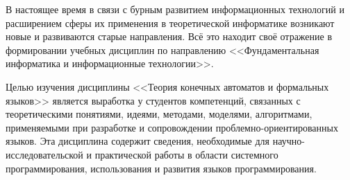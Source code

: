 \label{Intro}
В настоящее время в связи с бурным развитием информационных технологий и расширением сферы их применения в теоретической информатике возникают новые и развиваются старые направления. Всё это находит своё отражение в формировании учебных дисциплин по направлению <<Фундаментальная информатика и информационные технологии>>. 

Целью изучения дисциплины <<Теория конечных автоматов и формальных языков>> является выработка у студентов компетенций, связанных с теоретическими понятиями, идеями, методами, моделями, алгоритмами, применяемыми при разработке и сопровождении проблемно-ориентированных языков. Эта дисциплина содержит сведения, необходимые для научно-исследовательской и практической работы в области системного программирования, использования и развития языков программирования.

